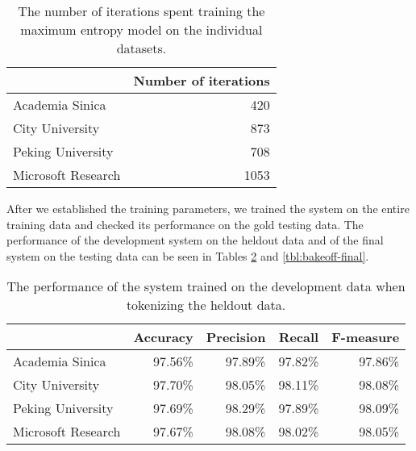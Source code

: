 \begin{table}
  \begin{center}
    \begin{tabular}{ | l | r | }
      \hline
      & Number of iterations \\ \hline
      Academia Sinica & 420 \\ \hline
      City University & 873 \\ \hline
      Peking University & 708 \\ \hline
      Microsoft Research & 1053 \\
      \hline
    \end{tabular}
  \end{center}
  \caption[Number of training iterations for Chinese segmentation]
    {The number of iterations spent training the maximum entropy model on the
    individual datasets.}
  \label{tbl:bakeoff-iters}
\end{table}

After we established the training parameters, we trained the system on the
entire training data and checked its performance on the gold testing data. The
performance of the development system on the heldout data and of the final
system on the testing data can be seen in Tables \ref{tbl:bakeoff-devel} and
\ref{tbl:bakeoff-final}.

\begin{table}
  \begin{center}
    \begin{tabular}{ | l | r | r | r | r | }
      \hline
      & Accuracy & Precision & Recall & F-measure \\ \hline
      Academia Sinica & 97.56\% & 97.89\% & 97.82\% & 97.86\% \\ \hline
      City University & 97.70\% & 98.05\% & 98.11\% & 98.08\% \\ \hline
      Peking University & 97.69\% & 98.29\% & 97.89\% & 98.09\% \\ \hline
      Microsoft Research & 97.67\% & 98.08\% & 98.02\% & 98.05\% \\
      \hline
    \end{tabular}
  \end{center}
  \caption[Development performance of Chinese segmenter]
    {The performance of the system trained on the development data when
     tokenizing the heldout data.}
  \label{tbl:bakeoff-devel}
\end{table}

